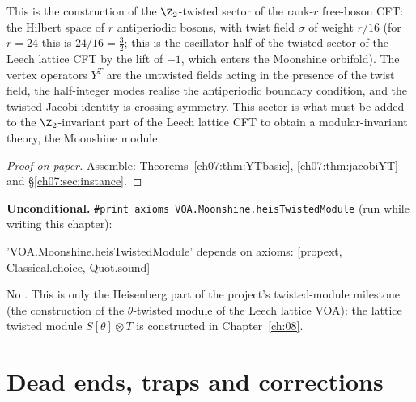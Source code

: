 \begin{physics}
This is the construction of the $\Z_2$-twisted sector of the rank-$r$ free-boson CFT: the Hilbert space of $r$ antiperiodic bosons, with twist field $\sigma$ of weight $r/16$ (for $r=24$ this is $24/16=\tfrac32$; this is the oscillator half of the twisted sector of the Leech lattice CFT by the lift of $-1$, which enters the Moonshine orbifold). The vertex operators $Y^T$ are the untwisted fields acting in the presence of the twist field, the half-integer modes realise the antiperiodic boundary condition, and the twisted Jacobi identity is crossing symmetry. This sector is what must be added to the $\Z_2$-invariant part of the Leech lattice CFT to obtain a modular-invariant theory, the Moonshine module.
\end{physics}

\begin{proof}[Proof on paper]
Assemble: Theorems~\ref{ch07:thm:YTbasic}, \ref{ch07:thm:jacobiYT} and \S\ref{ch07:sec:instance}.
\end{proof}

\begin{status}
\textbf{Unconditional.} \verb|#print axioms VOA.Moonshine.heisTwistedModule| (run while writing
this chapter):
\begin{plaincode}
'VOA.Moonshine.heisTwistedModule' depends on axioms: [propext, Classical.choice, Quot.sound]
\end{plaincode}
No . This is only the Heisenberg part of the project's twisted-module milestone (the construction of the $\theta$-twisted
module of the Leech lattice VOA): the lattice twisted module
$S[\theta]\otimes T$ is constructed in Chapter~\ref{ch:08}.
\end{status}

\section{Dead ends, traps and corrections}\label{ch07:sec:deadends}

